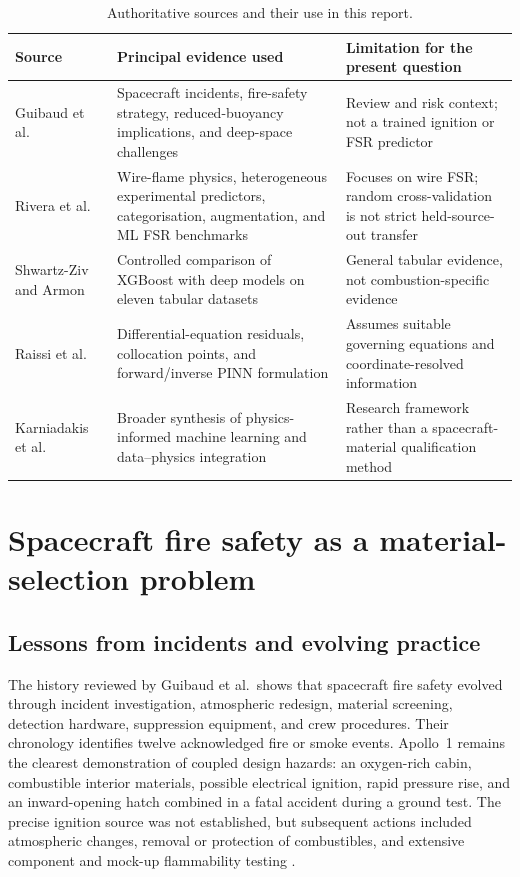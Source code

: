 \begin{table}[htbp]
    \centering
    \caption{Authoritative sources and their use in this report.}
    \label{tab:source_roles}
    \begin{tabular}{p{}p{}p{}}
        \hline
        Source & Principal evidence used & Limitation for the present question \\
        \hline
        Guibaud et al.\ \cite{guibaud2022spacecraft} &
        Spacecraft incidents, fire-safety strategy, reduced-buoyancy implications, and deep-space challenges &
        Review and risk context; not a trained ignition or FSR predictor \\
        \hline
        Rivera et al.\ \cite{riveraWireML} &
        Wire-flame physics, heterogeneous experimental predictors, categorisation, augmentation, and ML FSR benchmarks &
        Focuses on wire FSR; random cross-validation is not strict held-source-out transfer \\
        \hline
        Shwartz-Ziv and Armon \cite{shwartzZiv2022tabular} &
        Controlled comparison of XGBoost with deep models on eleven tabular datasets &
        General tabular evidence, not combustion-specific evidence \\
        \hline
        Raissi et al.\ \cite{raissi2019pinn} &
        Differential-equation residuals, collocation points, and forward/inverse PINN formulation &
        Assumes suitable governing equations and coordinate-resolved information \\
        \hline
        Karniadakis et al.\ \cite{karniadakis2021physicsinformed} &
        Broader synthesis of physics-informed machine learning and data--physics integration &
        Research framework rather than a spacecraft-material qualification method \\
        \hline
    \end{tabular}
\end{table}

\section{Spacecraft fire safety as a material-selection problem}

\subsection{Lessons from incidents and evolving practice}

The history reviewed by Guibaud et al.\ shows that spacecraft fire safety evolved through incident investigation, atmospheric redesign, material screening, detection hardware, suppression equipment, and crew procedures. Their chronology identifies twelve acknowledged fire or smoke events. Apollo~1 remains the clearest demonstration of coupled design hazards: an oxygen-rich cabin, combustible interior materials, possible electrical ignition, rapid pressure rise, and an inward-opening hatch combined in a fatal accident during a ground test. The precise ignition source was not established, but subsequent actions included atmospheric changes, removal or protection of combustibles, and extensive component and mock-up flammability testing \cite{guibaud2022spacecraft}.

